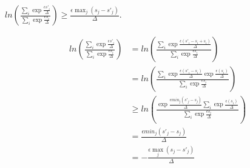 \documentclass{article}
\begin{document}
\begin{lemma}
    \label{priv-inequality}
    $ln\left(\frac{\sum_{i} \exp{\frac{\epsilon s'_i}{\Delta}}}{\sum_{i} \exp{\frac{\epsilon s_i}{\Delta}}}\right) \geq \frac{\epsilon \max_j (s_j - s'_j)}{\Delta}$.
\end{lemma}

\begin{align*}
    ln\left(\frac{\sum_{i} \exp{\frac{\epsilon s'_i}{\Delta}}}{\sum_{i} \exp{\frac{\epsilon s_i}{\Delta}}}\right)
    &= ln\left(\frac{\sum_{i} \exp{\frac{\epsilon (s'_i - s_i + s_i)}{\Delta}}}{\sum_{i} \exp{\frac{\epsilon s_i}{\Delta}}}\right) \\
    &= ln\left(\frac{\sum_{i} \exp{\frac{\epsilon (s'_i - s_i)}{\Delta}}\exp{\frac{\epsilon (s_i)}{\Delta}}}{\sum_{i} \exp{\frac{\epsilon s_i}{\Delta}}}\right) \\
    &\geq ln\left(\frac{\exp{\frac{\epsilon min_j(s'_j - s_j)}{\Delta}} \sum_{i} \exp{\frac{\epsilon (s_i)}{\Delta}}}{\sum_{i} \exp{\frac{\epsilon s_i}{\Delta}}}\right) \\
    &= \frac{\epsilon min_j(s'_j - s_j)}{\Delta} \\
    &= -\frac{\epsilon \max_j (s_j - s'_j)}{\Delta}
\end{align*}




\end{document}
